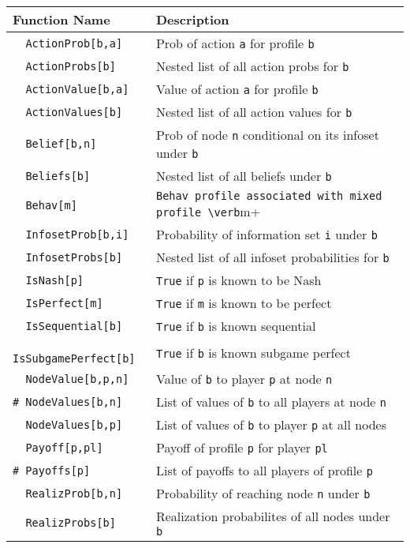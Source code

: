 \begin{table}[htp]
\begin{center}
\begin{tabular} {|l||l|} \hline
Function Name	& Description \\ 
\hline
\verb+  ActionProb[b,a]+ & Prob of action \verb+a+ for profile \verb+b+\\
\verb+  ActionProbs[b]+ & Nested list of all action probs for \verb+b+ \\ 
\verb+  ActionValue[b,a]+ & Value of action \verb+a+ for profile \verb+b+\\ 
\verb+  ActionValues[b]+ & Nested list of all action values for \verb+b+ \\ 
\verb+  Belief[b,n]+ & Prob of node \verb+n+ conditional on its
infoset under \verb+b+\\ 
\verb+  Beliefs[b]+ & Nested list of all beliefs under \verb+b+\\ 
\verb+  Behav[m]+ & \verb+Behav profile associated with mixed profile \verb+m+\\
\verb+  InfosetProb[b,i]+ & Probability of information set \verb+i+
under \verb+b+\\ 
\verb+  InfosetProbs[b]+ & Nested list of all infoset probabilities
for \verb+b+\\ 
\verb+  IsNash[p]+ &\verb+True+ if \verb+p+ is known to be Nash\\
\verb+  IsPerfect[m]+ &\verb+True+ if \verb+m+ is known to be perfect\\
\verb+  IsSequential[b]+ &\verb+True+ if \verb+b+ is known sequential\\
\verb+  IsSubgamePerfect[b]+ &  \verb+True+ if \verb+b+ is known subgame perfect\\ 
\verb+  NodeValue[b,p,n]+ & Value of \verb+b+ to player \verb+p+ at
node \verb+n+\\ 
\verb+# NodeValues[b,n]+ & List of values of \verb+b+ to all players at node \verb+n+\\
\verb+  NodeValues[b,p]+ & List of values of \verb+b+ to player \verb+p+ at all nodes\\
\verb+  Payoff[p,pl]+ & Payoff of profile \verb+p+ for player \verb+pl+\\
\verb+# Payoffs[p]+ & List of payoffs to all players of profile \verb+p+\\
\verb+  RealizProb[b,n]+ & Probability of reaching node \verb+n+ under \verb+b+\\
\verb+  RealizProbs[b]+ & Realization probabilites of all nodes under \verb+b+\\ 

\end{tabular}
\end{center}
\end{table}
